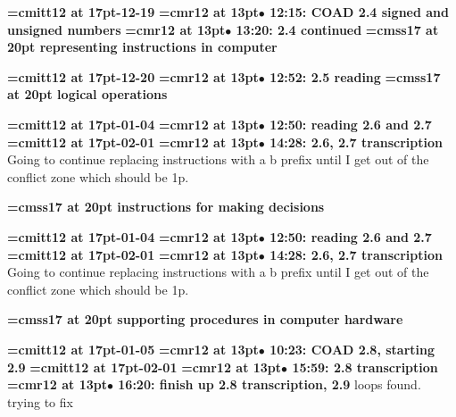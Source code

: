 {\medskip\noindent\bf\font\titlefont=cmitt12 at 17pt-12-19}\medskip
{\smallskip\noindent\bf\font\titlefont=cmr12 at 13pt\titlefont $\bullet$ 12:15: COAD 2.4 signed and unsigned numbers}\smallskip
{\smallskip\noindent\bf\font\titlefont=cmr12 at 13pt\titlefont $\bullet$ 13:20: 2.4 continued}\smallskip
{}
{\medskip\noindent\bf\font\titlefont=cmss17 at 20pt representing instructions in computer}\medskip

{\medskip\noindent\bf\font\titlefont=cmitt12 at 17pt-12-20}\medskip
{\smallskip\noindent\bf\font\titlefont=cmr12 at 13pt\titlefont $\bullet$ 12:52: 2.5 reading}\smallskip
{}
{\medskip\noindent\bf\font\titlefont=cmss17 at 20pt logical operations}\medskip

{\medskip\noindent\bf\font\titlefont=cmitt12 at 17pt-01-04}\medskip
{\smallskip\noindent\bf\font\titlefont=cmr12 at 13pt\titlefont $\bullet$ 12:50: reading 2.6 and 2.7}\smallskip
{\medskip\noindent\bf\font\titlefont=cmitt12 at 17pt-02-01}\medskip
{\smallskip\noindent\bf\font\titlefont=cmr12 at 13pt\titlefont $\bullet$ 14:28: 2.6, 2.7 transcription}\smallskip
Going to continue replacing instructions with a b prefix until I get out of the conflict zone which should be 1p.
\par

{\medskip\noindent\bf\font\titlefont=cmss17 at 20pt instructions for making decisions}\medskip

{\medskip\noindent\bf\font\titlefont=cmitt12 at 17pt-01-04}\medskip
{\smallskip\noindent\bf\font\titlefont=cmr12 at 13pt\titlefont $\bullet$ 12:50: reading 2.6 and 2.7}\smallskip
{\medskip\noindent\bf\font\titlefont=cmitt12 at 17pt-02-01}\medskip
{\smallskip\noindent\bf\font\titlefont=cmr12 at 13pt\titlefont $\bullet$ 14:28: 2.6, 2.7 transcription}\smallskip
Going to continue replacing instructions with a b prefix until I get out of the conflict zone which should be 1p.
\par

{\medskip\noindent\bf\font\titlefont=cmss17 at 20pt supporting procedures in computer hardware}\medskip

{\medskip\noindent\bf\font\titlefont=cmitt12 at 17pt-01-05}\medskip
{\smallskip\noindent\bf\font\titlefont=cmr12 at 13pt\titlefont $\bullet$ 10:23: COAD 2.8, starting 2.9}\smallskip
{\medskip\noindent\bf\font\titlefont=cmitt12 at 17pt-02-01}\medskip
{\smallskip\noindent\bf\font\titlefont=cmr12 at 13pt\titlefont $\bullet$ 15:59: 2.8 transcription}\smallskip
{\smallskip\noindent\bf\font\titlefont=cmr12 at 13pt\titlefont $\bullet$ 16:20: finish up 2.8 transcription, 2.9}\smallskip
loops found. trying to fix
\par

